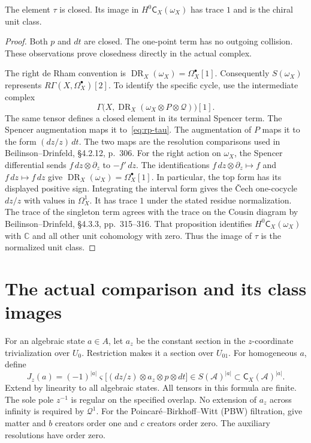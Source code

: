 \begin{lemma}\label{lem:rp-unit}
The element $\tau$ is closed.
Its image in $H^0\mathsf C_X(\omega_X)$ has trace $1$ and is the chiral unit class.
\end{lemma}

\begin{proof}
Both $p$ and $dt$ are closed.
The one-point term has no outgoing collision.
These observations prove closedness directly in the actual complex.

The right de Rham convention is
$\operatorname{DR}_X(\omega_X)=\Omega_X^\bullet[1]$.
Consequently $S(\omega_X)$ represents $R\Gamma(X,\Omega_X^\bullet)[2]$.
To identify the specific cycle, use the intermediate complex
\[
 \Gamma\bigl(X,\operatorname{DR}_X(\omega_X\otimes P\otimes\mathcal Q)\bigr)[1].
\]
The same tensor defines a closed element in its terminal Spencer term.
The Spencer augmentation maps it to~\eqref{eq:rp-tau}.
The augmentation of $P$ maps it to the form $(dz/z)\,dt$.
The two maps are the resolution comparisons used in Beilinson--Drinfeld, \S4.2.12, p.~306.
For the right action on $\omega_X$, the Spencer differential sends $f\,dz\otimes\partial_z$ to $-f'\,dz$.
The identifications $f\,dz\otimes\partial_z\mapsto f$ and $f\,dz\mapsto f\,dz$ give $\operatorname{DR}_X(\omega_X)=\Omega_X^\bullet[1]$.
In particular, the top form has its displayed positive sign.
Integrating the interval form gives the \v Cech one-cocycle $dz/z$ with values in $\Omega_X^1$.
It has trace $1$ under the stated residue normalization.
The trace of the singleton term agrees with the trace on the Cousin diagram by Beilinson--Drinfeld, \S4.3.3, pp.~315--316.
That proposition identifies $H^0\mathsf C_X(\omega_X)$ with $\mathbb C$ and all other unit cohomology with zero.
Thus the image of $\tau$ is the normalized unit class.
\end{proof}

\section{The actual comparison and its class images}

For an algebraic state $a\in A$, let $a_z$ be the constant section in the $z$-coordinate trivialization over $U_0$.
Restriction makes it a section over $U_{01}$.
For homogeneous $a$, define
\begin{equation}\label{eq:rp-J}
 J_z(a)=(-1)^{|a|}\varsigma
 \bigl[(dz/z)\otimes a_z\otimes p\otimes dt\bigr]
 \in S(\mathcal A)^{|a|}\subset\mathsf C_X(\mathcal A)^{|a|}.
\end{equation}
Extend by linearity to all algebraic states.
All tensors in this formula are finite.
The sole pole $z^{-1}$ is regular on the specified overlap.
No extension of $a_z$ across infinity is required by $\mathcal Q^1$.
For the Poincar\'e--Birkhoff--Witt (PBW) filtration, give matter and $b$ creators order one and $c$ creators order zero.
The auxiliary resolutions have order zero.

